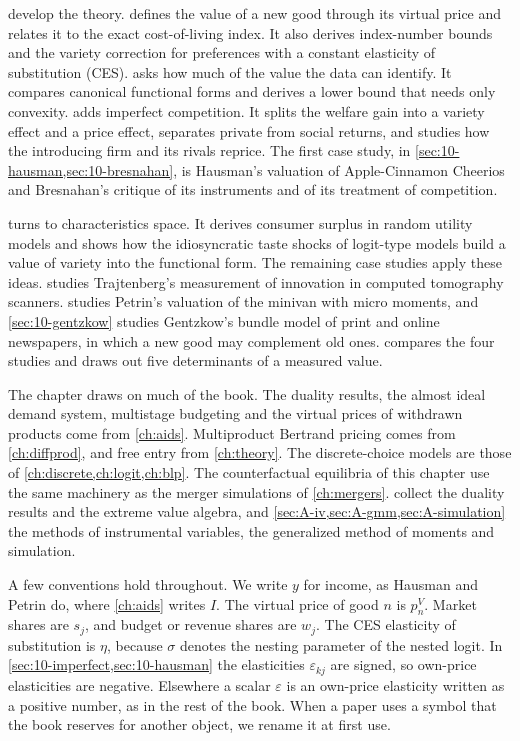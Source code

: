  develop the theory.  defines the
value of a new good through its virtual price and relates it to the exact cost-of-living index. It also derives
index-number bounds and the variety correction for preferences with a constant elasticity of substitution (CES).
 asks how much of the value the data can identify. It compares canonical functional forms
and derives a lower bound that needs only convexity.  adds imperfect competition. It splits
the welfare gain into a variety effect and a price effect, separates private from social returns, and studies how
the introducing firm and its rivals reprice. The first case study, in \cref{sec:10-hausman,sec:10-bresnahan}, is
Hausman's valuation of Apple-Cinnamon Cheerios and Bresnahan's critique of its instruments and of its treatment of
competition.

 turns to characteristics space. It derives consumer surplus in random utility models and
shows how the idiosyncratic taste shocks of logit-type models build a value of variety into the functional form.
The remaining case studies apply these ideas.  studies Trajtenberg's measurement of
innovation in computed tomography scanners.  studies Petrin's valuation of the minivan with
micro moments, and \cref{sec:10-gentzkow} studies Gentzkow's bundle model of print and online newspapers, in which
a new good may complement old ones.  compares the four studies and draws out five
determinants of a measured value.

The chapter draws on much of the book. The duality results, the almost ideal demand system, multistage budgeting
and the virtual prices of withdrawn products come from \cref{ch:aids}. Multiproduct Bertrand pricing comes from
\cref{ch:diffprod}, and free entry from \cref{ch:theory}. The discrete-choice models are those of
\cref{ch:discrete,ch:logit,ch:blp}. The counterfactual equilibria of this chapter use the same machinery as the
merger simulations of \cref{ch:mergers}.  collect the duality results and the extreme
value algebra, and \cref{sec:A-iv,sec:A-gmm,sec:A-simulation} the methods of instrumental variables, the
generalized method of moments and simulation.

A few conventions hold throughout. We write $y$ for income, as Hausman and Petrin do, where \cref{ch:aids} writes
$I$. The virtual price of good $n$ is $p_n^V$. Market shares are $s_j$, and budget or revenue shares are $w_j$. The
CES elasticity of substitution is $\eta$, because $\sigma$ denotes the nesting parameter of the nested logit. In
\cref{sec:10-imperfect,sec:10-hausman} the elasticities $\varepsilon_{kj}$ are signed, so own-price elasticities
are negative. Elsewhere a scalar $\varepsilon$ is an own-price elasticity written as a positive number, as in the
rest of the book. When a paper uses a symbol that the book reserves for another object, we rename it at first use.

